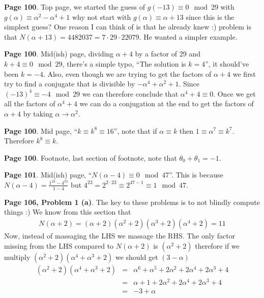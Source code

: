 \documentclass[aps,preprint,preprintnumbers,nofootinbib,showpacs,prd]{revtex4-1}
\newcommand{\nbea}{\begin{eqnarray*}}
\newcommand{\neea}{\end{eqnarray*}}
\begin{document}
{\bf Page 100}. Top page, we started the guess of $g(-13) \equiv 0 \mod{29}$ with $g(\alpha) \equiv \alpha^2 - \alpha^4 + 1$ why not start with $g(\alpha) \equiv \alpha + 13$ since this is the simplest guess? One reason I can think of is that he already knew :) problem is that $N(\alpha + 13) = 4482037 = 7 \cdot 29 \cdot 22079$. He wanted a simpler example.

{\bf Page 100}. Mid(ish) page, dividing $\alpha + 4$ by a factor of 29 and $k + 4 \equiv 0 \mod{29}$, there's a simple typo, ``The solution is $k = 4$'', it should've been $k = -4$. Also, even though we are trying to get the factors of $\alpha + 4$ we first try to find a conjugate that is divisible by $-\alpha^4 + \alpha^2 + 1$. Since $(-13)^4 \equiv -4 \mod{29}$ we can therefore conclude that $\alpha^4 + 4 \equiv 0$. Once we get all the factors of $\alpha^4 + 4$ we can do a conjugation at the end to get the factors of $\alpha + 4$ by taking $\alpha \to \alpha^2$.

{\bf Page 100}. Mid page, ``$k \equiv k^8 \equiv 16$'', note that if $\alpha \equiv k$ then $1 \equiv \alpha^7 \equiv k^7$. Therefore $k^8 \equiv k$.

{\bf Page 100}. Footnote, last section of footnote, note that $\theta_0 + \theta_1 = -1$.

{\bf Page 101}. Mid(ish) page, ``$N(\alpha - 4) \equiv 0 \mod{47}$''. This is because $N(\alpha - 4) = \frac{1^{23} - 4^{23}}{1 - 4}$ but $4^{23} = 2^{2\cdot 23} \equiv 2^{47-1} \equiv 1 \mod{47}$.

{\bf Page 106, Problem 1 (a)}. The key to these problems is to not blindly compute things :) We know from this section that
%
\nbea
N(\alpha + 2) = (\alpha + 2)(\alpha^2 + 2)(\alpha^3 + 2)(\alpha^4 + 2) = 11
\neea
%
Now, instead of massaging the LHS we massage the RHS. The only factor missing from the LHS compared to $N(\alpha + 2)$ is $(\alpha^2 + 2)$ therefore if we multiply $(\alpha^2 + 2)(\alpha^4 + \alpha^3 + 2)$ we should get $(3 - \alpha)$
%
\nbea
(\alpha^2 + 2)(\alpha^4 + \alpha^3 + 2) & = & \alpha^6 + \alpha^5 + 2\alpha^2 + 2\alpha^4 + 2\alpha^3 + 4 \\
& = & \alpha + 1 + 2\alpha^2 + 2\alpha^4 + 2\alpha^3 + 4 \\
& = & -3 + \alpha
\neea
%
\end{document}
